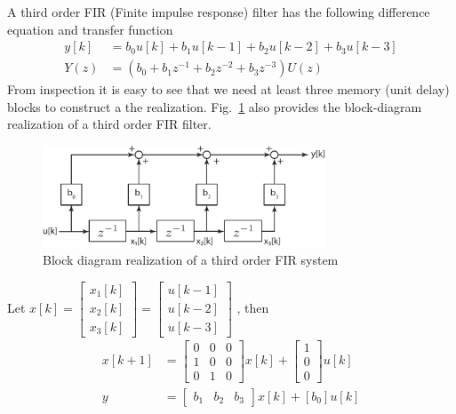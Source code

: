 \documentclass[twoside]{article}
\begin{document}
A third order FIR (Finite impulse response) filter has the following
difference equation and transfer function
%
\begin{align*}
y[k] &= b_0 u[k] + b_1 u[k-1] + b_2 u[k-2] + b_3 u[k-3] \\ 
Y(z) &= \left( b_0 + b_1 z^{-1} + b_2 z^{-2} + b_3 z^{-3} \right) U(z)
\end{align*}
%
From inspection it is easy to see that we need at least three memory (unit delay) 
blocks to construct a the realization. Fig.~\ref{fig:FIR} also 
provides the block-diagram realization of a third order FIR filter.
%
\begin{figure}[h]
    \centering
      \includegraphics[width=0.75\textwidth]{FIR}
    \caption{Block diagram realization of a third order FIR system}
        \label{fig:FIR}
\end{figure}
%
Let $x[k] = \left[ \begin{array}{c} x_1[k] \\ x_2[k] \\ x_3[k]
\end{array} \right] = \left[ \begin{array}{c} u[k-1] \\ u[k-2] \\
                               u[k-3] \end{array} \right] $ , then 
%
\begin{align*}
 x[k+1] &= \left[  \begin{array}{ccc} 0 & 0 & 0 \\ 1 & 0 & 0 \\ 0 & 1 & 0 \end{array} \right] x[k] 
 +  \left[  \begin{array}{c} 1 \\ 0 \\ 0  \end{array} \right] u[k]
 \\
 y &= \left[  \begin{array}{ccc} b_1 & b_2 & b_3 \end{array} \right] x[k] + [b_0] u[k]
\end{align*}
%
\end{document}
